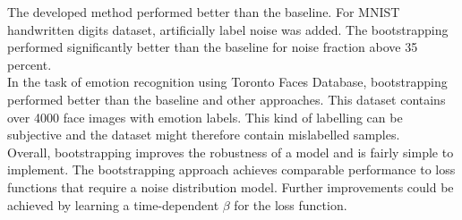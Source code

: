 The developed method performed better than the baseline. For MNIST handwritten digits dataset, artificially label noise was added. The bootstrapping performed significantly better than the baseline for noise fraction above 35 percent.\\

In the task of emotion recognition using Toronto Faces Database, bootstrapping performed better than the baseline and other approaches. This dataset contains over 4000 face images with emotion labels. This kind of labelling can be subjective and the dataset might therefore contain mislabelled samples. \\

Overall, bootstrapping improves the robustness of a model and is fairly simple to implement. The bootstrapping approach achieves comparable performance to loss functions that require a noise distribution model. Further improvements could be achieved by learning a time-dependent $\beta$ for the loss function.











